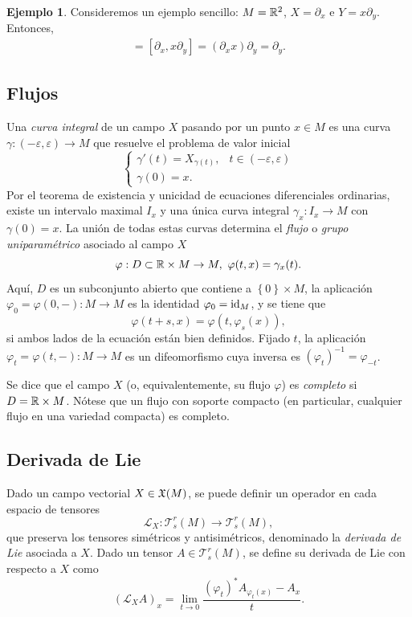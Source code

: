 \documentclass[11pt,a4paper]{amsbook}
\theoremstyle{remark} \newtheorem{rmk}[subsection]{Observación}
\theoremstyle{definition} \newtheorem{defn}[subsection]{Definición}
\theoremstyle{definition} \newtheorem{ex}[subsection]{Ejemplo}
\theoremstyle{definition} \newtheorem{ej}[subsection]{Ejercicio}
\begin{document}
\begin{ex}
  Consideremos un ejemplo sencillo: $M=\mathbb R^2$, $X=\partial_x$ e $Y=x\partial_y$. Entonces,
  \begin{align*}
[X,Y]  = [\partial_x,x\partial_y] = (\partial_xx)\partial_y = \partial_y.
  \end{align*}

\end{ex}

\subsection{Flujos} Una \emph{curva integral} de un campo $X$ pasando por un punto $x\in M$ es una curva $\gamma:(-\varepsilon,\varepsilon) \rightarrow M$ que resuelve el problema de valor inicial
\begin{equation*}
\begin{cases}
  \gamma'(t) = X_{\gamma(t)}, & t\in (-\varepsilon,\varepsilon) \\
  \gamma(0) = x.
\end{cases}
\end{equation*}
Por el teorema de existencia y unicidad de ecuaciones diferenciales ordinarias, existe un intervalo maximal $I_x$ y una única curva integral $\gamma_x:I_x\rightarrow M$ con $\gamma(0)=x$. La unión de todas estas curvas determina el \emph{flujo} o \emph{grupo uniparamétrico} asociado al campo $X$
\begin{equation*}
\varphi: D \subset \mathbb R \times M \rightarrow M,\ \varphi(t,x) = \gamma_x(t).
\end{equation*}
Aquí, $D$ es un subconjunto abierto que contiene a $\left\{ 0 \right\}\times M$, la aplicación $\varphi_0=\varphi(0,-):M\rightarrow M$ es la identidad $\varphi_0=\mathrm{id}_M$, y se tiene que
\begin{equation*}
\varphi(t+s,x) = \varphi(t,\varphi_s(x)),
\end{equation*}
si ambos lados de la ecuación están bien definidos. Fijado $t$, la aplicación $\varphi_t=\varphi(t,-):M\rightarrow M$ es un difeomorfismo cuya inversa es $(\varphi_t)^{-1}=\varphi_{-t}$.

Se dice que el campo $X$ (o, equivalentemente, su flujo $\varphi$) es \emph{completo} si $D=\mathbb R \times M$. Nótese que un flujo con soporte compacto (en particular, cualquier flujo en una variedad compacta) es completo.

\subsection{Derivada de Lie} Dado un campo vectorial $X \in \mathfrak X(M)$, se puede definir un operador en cada espacio de tensores
\begin{equation*}
\mathcal{L}_X: \mathcal{T}^{r}_s(M) \rightarrow \mathcal{T}^{r}_s(M),
\end{equation*}
que preserva los tensores simétricos y antisimétricos, denominado la \emph{derivada de Lie} asociada a $X$. Dado un tensor $A \in \mathcal{T}^r_s(M)$, se define su derivada de Lie con respecto a $X$ como
\begin{equation*}
(\mathcal{L}_X A)_x = \lim_{t\rightarrow 0} \frac{(\varphi_t)^* A_{\varphi_t(x)}- A_x}{t}.
\end{equation*}
\end{document}
